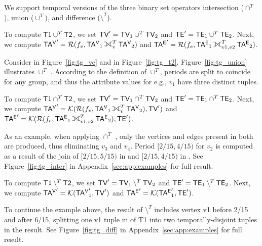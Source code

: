 We support temporal versions of the three binary set operators
intersection ($\cap^T$), union ($\cup^T$), and difference
($\setminus^T$).


To compute $\textsf{T1} \cup^T \textsf{T2}$, we set $\textsf{TV}' = \textsf{TV}_1 \cup^T
\textsf{TV}_2$ and $\textsf{TE}' = \textsf{TE}_1 \cup^T \textsf{TE}_2$.  Next, we compute $\tav' =
\resolve{f_v}{\tav_1 \fullouterjoin^T_{v} \tav_2}$ and $\tae' =
\resolve{f_e}{\tae_1 \fullouterjoin^T_{v1,v2} \tae_2}$. 

Consider  in Figure~\ref{fig:tg_ve} and  in
Figure~\ref{fig:tg_t2}.  Figure~\ref{fig:tg_union} illustrates
 $\cup^T$ .  According to the definition of
$\cup^T$, periods are split to coincide for any group, and thus the
attribute values for e.g., $v_1$ have three distinct tuples.

To compute $\textsf{T1} \cap^T \textsf{T2}$, we set $\textsf{TV}' = \textsf{TV}_1 \cap^T
\textsf{TV}_2$ and $\textsf{TE}' = \textsf{TE}_1 \cap^T \textsf{TE}_2$.  Next, we compute $\tav' =
\constr{\resolve{f_v}{\tav_1 \fullouterjoin^T_{v} \tav_2}}{\tv'}$ and
$\tae' = \constr{\resolve{f_e}{\tae_1 \fullouterjoin^T_{v1,v2}
    \tae_2}}{\te'}$.

As an example, when applying  $\cap^T$ , only the
vertices and edges present in both \tgs are produced, thus eliminating
$v_3$ and $v_4$.  Period $[2/15, 4/15)$ for $v_2$ is computed as a
  result of the join of $[2/15, 5/15)$ in  and [$2/15,
      4/15)$ in .  See Figure~\ref{fig:tg_inter} in
      Appendix~\ref{sec:app:examples} for full result.

To compute $\textsf{T1} \setminus^T \textsf{T2}$, we set $\textsf{TV}' = \textsf{TV}_1
\setminus^T \textsf{TV}_2$ and $\textsf{TE}' = \textsf{TE}_1 \setminus^T \textsf{TE}_2$.  Next, we
compute $\mathsf{TA^{V}}' = \mathcal{K}({\mathsf{TA^{V}}}'_1,\textsf{TV}')$ and $\mathsf{TA^{E}}' =
\mathcal{K}({\mathsf{TA^{E}}}'_1,\textsf{TE}')$.

To continue the example above, the result of  $\setminus^T$
 includes vertex v1 before 2/15 and after 6/15, splitting
one v1 tuple in \tv of T1 into two temporally-disjoint tuples in the
result.  See Figure~\ref{fig:tg_diff} in
Appendix~\ref{sec:app:examples} for full result.

